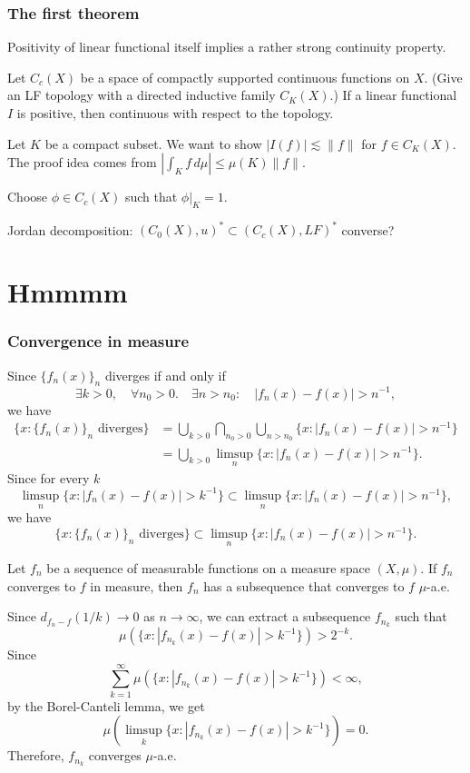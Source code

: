 \documentclass{../crs}
\begin{document}
\subsection{The first theorem}
Positivity of linear functional itself implies a rather strong continuity property.
\begin{thm}
Let $C_c(X)$ be a space of compactly supported continuous functions on $X$.
(Give an LF topology with a directed inductive family $C_K(X)$.)
If a linear functional $I$ is positive, then continuous with respect to the topology.
\end{thm}
\begin{pf}
Let $K$ be a compact subset.
We want to show $|I(f)|\lesssim\|f\|$ for $f\in C_K(X)$.
The proof idea comes from $|\int_K f\,d\mu|\le\mu(K)\|f\|$.

Choose $\phi\in C_c(X)$ such that $\phi|_K=1$.
\end{pf}





Jordan decomposition: $(C_0(X),u)^*\subset(C_c(X),LF)^*$
converse?




\chapter{Hmmmm}

\subsection{Convergence in measure}
Since $\{f_n(x)\}_n$ diverges if and only if
\[\exists k>0,\quad\forall n_0>0.\quad\exists n>n_0:\quad |f_n(x)-f(x)|>n^{-1},\]
we have
\begin{align*}
\{x:\{f_n(x)\}_n\text{ diverges}\}&=\bigcup_{k>0}\bigcap_{n_0>0}\bigcup_{n>n_0}\{x:|f_n(x)-f(x)|>n^{-1}\}\\
&=\bigcup_{k>0}\limsup_n\{x:|f_n(x)-f(x)|>n^{-1}\}.
\end{align*}
Since for every $k$
\[\limsup_n\{x:|f_n(x)-f(x)|>k^{-1}\}\subset\limsup_n\{x:|f_n(x)-f(x)|>n^{-1}\},\]
we have
\[\{x:\{f_n(x)\}_n\text{ diverges}\}\subset\limsup_n\{x:|f_n(x)-f(x)|>n^{-1}\}.\]




\begin{thm}
Let $f_n$ be a sequence of measurable functions on a measure space $(X,\mu)$.
If $f_n$ converges to $f$ in measure, then $f_n$ has a subsequence that converges to $f$ $\mu$-a.e.
\end{thm}
\begin{pf}
Since $d_{f_n-f}(1/k)\to0$ as $n\to\infty$, we can extract a subsequence $f_{n_k}$ such that
\[\mu(\{x:|f_{n_k}(x)-f(x)|>k^{-1}\})>2^{-k}.\]
Since
\[\sum_{k=1}^\infty\mu(\{x:|f_{n_k}(x)-f(x)|>k^{-1}\})<\infty,\]
by the Borel-Canteli lemma, we get
\[\mu(\limsup_k\{x:|f_{n_k}(x)-f(x)|>k^{-1}\})=0.\]
Therefore, $f_{n_k}$ converges $\mu$-a.e.
\end{pf}
\end{document}
